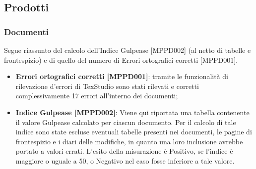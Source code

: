 \documentclass[openany,12pt,a4paper]{report}
\begin{document}
\subsection{Prodotti}

\subsubsection{Documenti}

Segue riassunto del calcolo dell'Indice Gulpease [MPPD002] (al netto di tabelle e frontespizio) e di quello del numero di Errori ortografici corretti [MPPD001].

\begin{itemize}
	\item \textbf{Errori ortografici corretti [MPPD001]}: tramite le funzionalità di rilevazione d'errori di TexStudio sono stati rilevati e corretti complessivamente 17 errori all'interno dei documenti;
	
	\item \textbf{Indice Gulpease [MPPD002]}: Viene qui riportata una tabella contenente il valore Gulpease calcolato per ciascun documento.
	Per il calcolo di tale indice sono state escluse eventuali tabelle presenti nei documenti, le pagine di frontespizio e i diari delle modifiche, in quanto una loro inclusione avrebbe portato a valori errati. L'esito della misurazione è Positivo, se l'indice è maggiore o uguale a 50, o Negativo nel caso fosse inferiore a tale valore.
	

\end{itemize}
\end{document}
